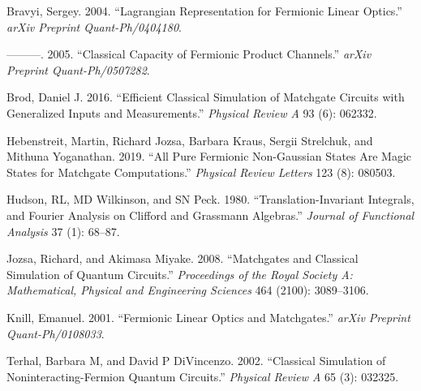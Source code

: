 \documentclass[
]{book}
\newlength{\cslhangindent}
\newenvironment{CSLReferences}[2] %
 {\begin{list}{}{%
  \setlength{\itemindent}{0pt}
  \setlength{\leftmargin}{0pt}
  \setlength{\parsep}{0pt}
  \ifodd #1
   \setlength{\leftmargin}{\cslhangindent}
   \setlength{\itemindent}{-1\cslhangindent}
  \fi
  \setlength{\itemsep}{#2\baselineskip}}}
 {\end{list}}
\theoremstyle{definition}
\theoremstyle{definition}
\theoremstyle{definition}
\theoremstyle{definition}
\theoremstyle{remark}
\begin{document}
\label{refs}
\begin{CSLReferences}{1}{0}
Bravyi, Sergey. 2004. {``Lagrangian Representation for Fermionic Linear Optics.''} \emph{arXiv Preprint Quant-Ph/0404180}.

---------. 2005. {``Classical Capacity of Fermionic Product Channels.''} \emph{arXiv Preprint Quant-Ph/0507282}.

Brod, Daniel J. 2016. {``Efficient Classical Simulation of Matchgate Circuits with Generalized Inputs and Measurements.''} \emph{Physical Review A} 93 (6): 062332.

Hebenstreit, Martin, Richard Jozsa, Barbara Kraus, Sergii Strelchuk, and Mithuna Yoganathan. 2019. {``All Pure Fermionic Non-Gaussian States Are Magic States for Matchgate Computations.''} \emph{Physical Review Letters} 123 (8): 080503.

Hudson, RL, MD Wilkinson, and SN Peck. 1980. {``Translation-Invariant Integrals, and Fourier Analysis on Clifford and Grassmann Algebras.''} \emph{Journal of Functional Analysis} 37 (1): 68--87.

Jozsa, Richard, and Akimasa Miyake. 2008. {``Matchgates and Classical Simulation of Quantum Circuits.''} \emph{Proceedings of the Royal Society A: Mathematical, Physical and Engineering Sciences} 464 (2100): 3089--3106.

Knill, Emanuel. 2001. {``Fermionic Linear Optics and Matchgates.''} \emph{arXiv Preprint Quant-Ph/0108033}.

Terhal, Barbara M, and David P DiVincenzo. 2002. {``Classical Simulation of Noninteracting-Fermion Quantum Circuits.''} \emph{Physical Review A} 65 (3): 032325.

\end{CSLReferences}
\end{document}
